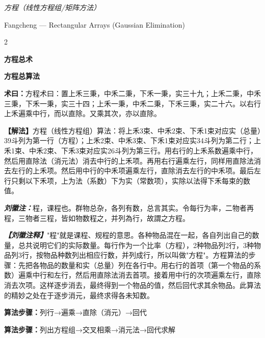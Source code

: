 \documentclass[10pt,a4paper]{article}
\newcommand{\shu}[1]{\textbf{术曰：}#1\par}
\newcommand{\liuhui}[1]{{\color{commentarycolor}\textit{\textbf{刘徽注：}}#1\par}}
\newcommand{\classicalheader}[1]{{\centering\large\bfseries\color{classicalcolor} #1\par\vspace{0.5em}}}
\newcommand{\shumodern}[1]{\textbf{【解法】}#1\par}
\newcommand{\liuhuimodern}[1]{{\color{commentarycolor}\textit{\textbf{【刘徽注释】}}#1\par}}
\newcommand{\modernheader}[1]{{\centering\large\bfseries\color{moderncolor} #1\par\vspace{0.5em}}}
\begin{document}
\begin{center}
{\Large\itshape\color{volcolor} 方程（线性方程组/矩阵方法）}

\vspace{0.3cm}
{\normalsize Fangcheng --- Rectangular Arrays (Gaussian Elimination)}
\end{center}

\vspace{0.5cm}

\begin{paracol}{2}
\classicalheader{方程总术}
\switchcolumn
\modernheader{方程总算法}
\switchcolumn*

\shu{方程术曰：置上禾三秉，中禾二秉，下禾一秉，实三十九；上禾二秉，中禾三秉，下禾一秉，实三十四；上禾一秉，中禾二秉，下禾三秉，实二十六。以右行上禾遍乘中行，而以直除。又乘其次，亦以直除。}

\switchcolumn

\shumodern{方程（线性方程组）算法：将上禾3束、中禾2束、下禾1束对应实（总量）39斗列为第一行（方程）；上禾2束、中禾3束、下禾1束对应实34斗列为第二行；上禾1束、中禾2束、下禾3束对应实26斗列为第三行。用右行的上禾系数遍乘中行，然后用直除法（消元法）消去中行的上禾项。再用右行遍乘左行，同样用直除法消去左行的上禾项。然后用中行的中禾项遍乘左行，直除消去左行的中禾项。最后左行只剩以下禾项，上为法（系数）下为实（常数项），实除以法得下禾每束的数值。}

\switchcolumn*

\liuhui{程，课程也。群物总杂，各列有数，总言其实。令每行为率，二物者再程，三物者三程，皆如物数程之，并列為行，故謂之方程。}

\switchcolumn

\liuhuimodern{"程"就是课程、规程的意思。各种物品混在一起，各自列出自己的数量，总共说明它们的实际数量。每行作为一个比率（方程），2种物品列2行，3种物品列3行，按物品种数列出相应行数，并列成行，所以叫做"方程"。方程算法的步骤：先把各物品的数量和实（总量）列在各行中。用右行的首项（第一个物品的系数）遍乘中行和左行，然后用直除法消去首项。接着用中行的次项遍乘左行，直除消去次项。这样逐步消去，最终得到一个物品的值，然后回代求其余物品。此算法的精妙之处在于逐步消元，最终求得各未知数。}

\switchcolumn*

{\small\textbf{算法步骤：}列行→遍乘→直除（消元）→回代}

\switchcolumn

{\small\textbf{算法步骤：}列出方程组→交叉相乘→消元法→回代求解}

\end{paracol}
\end{document}
